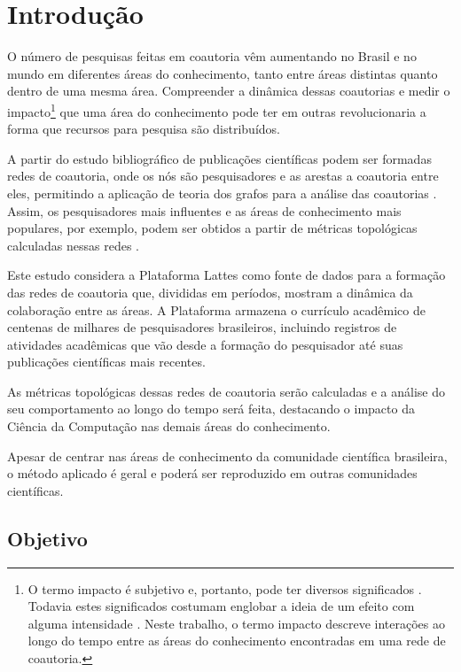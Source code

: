 \chapter[Introdução]{Introdução}

O número de pesquisas feitas em coautoria vêm aumentando no Brasil \cite{mena2014brazilian} e no mundo \cite{glanzel2003bibliometrics} em diferentes áreas do conhecimento, tanto entre áreas distintas quanto dentro de uma mesma área. Compreender a dinâmica dessas coautorias e medir o impacto\footnote{O termo impacto é subjetivo e, portanto, pode ter diversos significados \cite{roemer2015meaningful}. Todavia estes significados costumam englobar a ideia de um efeito com alguma intensidade \cite{roemer2015meaningful}. Neste trabalho, o termo impacto descreve interações ao longo do tempo entre as áreas do conhecimento encontradas em uma rede de coautoria.} que uma área do conhecimento pode ter em outras revolucionaria a forma que recursos para pesquisa são distribuídos.

A partir do estudo bibliográfico de publicações científicas podem ser formadas redes de coautoria, onde os nós são pesquisadores e as arestas a coautoria entre eles, permitindo a aplicação de teoria dos grafos para a análise das coautorias \cite{liu2005co}. Assim, os pesquisadores mais influentes e as áreas de conhecimento mais populares, por exemplo, podem ser obtidos a partir de métricas topológicas calculadas nessas redes \cite{franceschet2011collaboration}.

Este estudo considera a Plataforma Lattes como fonte de dados para a formação das redes de coautoria que, divididas em períodos, mostram a dinâmica da colaboração entre as áreas. A Plataforma armazena o currículo acadêmico de centenas de milhares de pesquisadores brasileiros, incluindo registros de atividades acadêmicas que vão desde a formação do pesquisador até suas publicações científicas mais recentes.

As métricas topológicas dessas redes de coautoria serão calculadas e a análise do seu comportamento ao longo do tempo será feita, destacando o impacto da Ciência da Computação nas demais áreas do conhecimento.

Apesar de centrar nas áreas de conhecimento da comunidade científica brasileira, o método aplicado é geral e poderá ser reproduzido em outras comunidades científicas.

\section{Objetivo}

